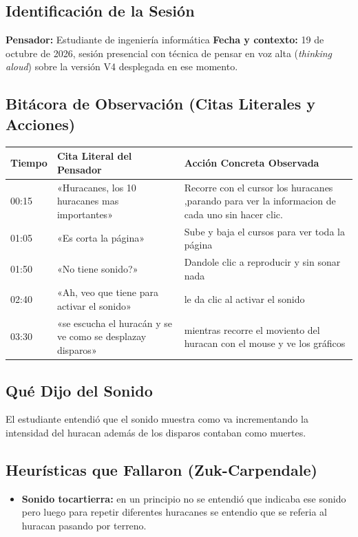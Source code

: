 \documentclass[11pt,a4paper]{article}
\begin{document}
	\subsection{Identificación de la Sesión}
	\textbf{Pensador:} Estudiante de ingeniería informática
	\textbf{Fecha y contexto:} 19 de octubre de 2026, sesión presencial con técnica de pensar en voz alta (\textit{thinking aloud}) sobre la versión V4 desplegada en ese momento.
	
	\subsection{Bitácora de Observación (Citas Literales y Acciones)}
	\begin{center}
		\small
		\begin{tabularx}{\textwidth}{lp{6.8cm}X}
			\toprule
			\textbf{Tiempo} & \textbf{Cita Literal del Pensador} & \textbf{Acción Concreta Observada} \\
			\midrule
			00:15 & «Huracanes, los 10 huracanes mas importantes» & Recorre con el cursor los huracanes ,parando para ver la informacion de cada uno sin hacer clic. \\
			01:05 & «Es corta la página» & Sube y baja el cursos para ver toda la página \\
			01:50 & «No tiene sonido?» & Dandole clic a reproducir y sin sonar nada \\
			02:40 & «Ah, veo que tiene para activar el sonido» &le da clic al activar el sonido \\
			03:30 & «se escucha el huracán y se ve como se desplazay disparos» & mientras recorre el moviento del huracan con el mouse y ve los gráficos \\
			\bottomrule
		\end{tabularx}
	\end{center}
	
	\subsection{Qué Dijo del Sonido}
	El estudiante entendió que el sonido muestra como va incrementando la intensidad del huracan además de los disparos contaban como muertes.
	
	\subsection{Heurísticas que Fallaron (Zuk-Carpendale)}
	\begin{itemize}
		\item \textbf{Sonido tocartierra:} en un principio no se entendió que indicaba ese sonido pero luego para repetir diferentes huracanes se entendio que se referia al huracan pasando por terreno.
        \end{itemize}
	
\end{document}
